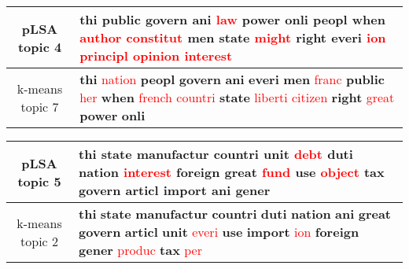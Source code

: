 \begin{center}\begin{tabularx}{\textwidth} {
  | c | >{\raggedright\arraybackslash}X | } \hline 
pLSA topic 4 & \textbf{thi} \textbf{public} \textbf{govern} \textbf{ani} \textcolor{red}{law} \textbf{power} \textbf{onli} \textbf{peopl} \textbf{when} \textcolor{red}{author} \textcolor{red}{constitut} \textbf{men} \textbf{state} \textcolor{red}{might} \textbf{right} \textbf{everi} \textcolor{red}{ion} \textcolor{red}{principl} \textcolor{red}{opinion} \textcolor{red}{interest} \\ \hline 
k-means topic 7 & \textbf{thi} \textcolor{red}{nation} \textbf{peopl} \textbf{govern} \textbf{ani} \textbf{everi} \textbf{men} \textcolor{red}{franc} \textbf{public} \textcolor{red}{her} \textbf{when} \textcolor{red}{french} \textcolor{red}{countri} \textbf{state} \textcolor{red}{liberti} \textcolor{red}{citizen} \textbf{right} \textcolor{red}{great} \textbf{power} \textbf{onli} \\ \hline 
\end{tabularx}

\end{center}

\begin{center}\begin{tabularx}{\textwidth} {
  | c | >{\raggedright\arraybackslash}X | } \hline 
pLSA topic 5 & \textbf{thi} \textbf{state} \textbf{manufactur} \textbf{countri} \textbf{unit} \textcolor{red}{debt} \textbf{duti} \textbf{nation} \textcolor{red}{interest} \textbf{foreign} \textbf{great} \textcolor{red}{fund} \textbf{use} \textcolor{red}{object} \textbf{tax} \textbf{govern} \textbf{articl} \textbf{import} \textbf{ani} \textbf{gener} \\ \hline 
k-means topic 2 & \textbf{thi} \textbf{state} \textbf{manufactur} \textbf{countri} \textbf{duti} \textbf{nation} \textbf{ani} \textbf{great} \textbf{govern} \textbf{articl} \textbf{unit} \textcolor{red}{everi} \textbf{use} \textbf{import} \textcolor{red}{ion} \textbf{foreign} \textbf{gener} \textcolor{red}{produc} \textbf{tax} \textcolor{red}{per} \\ \hline 
\end{tabularx}

\end{center}

